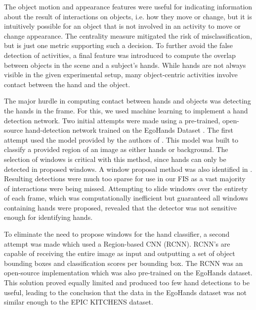 \documentclass[12pt]{report}
\begin{document}
The object motion and appearance features were useful for indicating information about the result of interactions on objects, i.e. how they move or change, but it is intuitively possible for an object that is not involved in an activity to move or change appearance. The centrality measure mitigated the risk of misclassification, but is just one metric supporting such a decision. To further avoid the false detection of activities, a final feature was introduced to compute the overlap between objects in the scene and a subject's hands. While hands are not always visible in the given experimental setup, many object-centric activities involve contact between the hand and the object. 

The major hurdle in computing contact between hands and objects was detecting the hands in the frame. For this, we used machine learning to implement a hand detection network. Two initial attempts were made using a pre-trained, open-source hand-detection network trained on the EgoHands Dataset \cite{Bambach2015}. The first attempt used the model provided by the authors of \cite{Bambach2015}. This model was built to classify a provided region of an image as either hands or background. The selection of windows is critical with this method, since hands can only be detected in proposed windows. A window proposal method was also identified in \cite{Bambach2015}. Resulting detections were much too sparse for use in our FIS as a vast majority of interactions were being missed. Attempting to slide windows over the entirety of each frame, which was computationally inefficient but guaranteed all windows containing hands were proposed, revealed that the detector was not sensitive enough for identifying hands.

To eliminate the need to propose windows for the hand classifier, a second attempt was made which used a Region-based CNN (RCNN). RCNN's are capable of receiving the entire image as input and outputting a set of object bounding boxes and classification scores per bounding box. The RCNN was an open-source implementation which was also pre-trained on the EgoHands dataset. This solution proved equally limited and produced too few hand detections to be useful, leading to the conclusion that the data in the EgoHands dataset was not similar enough to the EPIC KITCHENS dataset.
\end{document}
